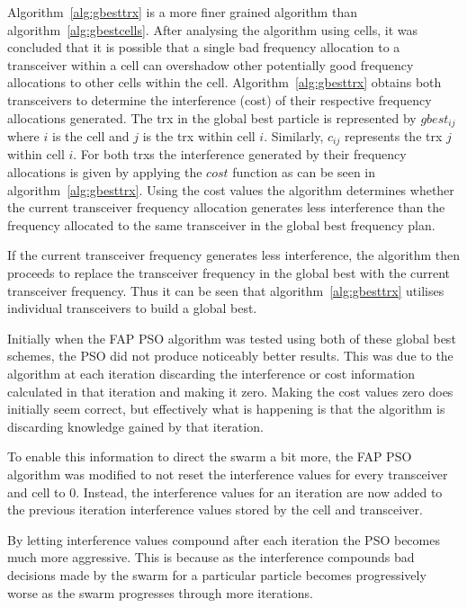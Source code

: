 Algorithm~\ref{alg:gbesttrx} is a more finer grained algorithm than algorithm~\ref{alg:gbestcells}. After analysing the algorithm using cells, it was concluded that it is possible that a single bad frequency allocation to a transceiver within a cell can overshadow other potentially good frequency allocations to other cells within the cell. Algorithm~\ref{alg:gbesttrx} obtains both transceivers to determine the interference (cost) of their respective frequency allocations generated. The trx in the global best particle is represented by $gbest_{ij}$ where $i$ is the cell and $j$ is the trx within cell $i$. Similarly, $c_{ij}$ represents the trx $j$ within cell $i$. For both trxs the interference generated by their frequency allocations is given by applying the $cost$ function as can be seen in algorithm~\ref{alg:gbesttrx}. Using the cost values the algorithm determines whether the current transceiver frequency allocation generates less interference than the frequency allocated to the same transceiver in the global best frequency plan.

If the current transceiver frequency generates less interference, the algorithm then proceeds to replace the transceiver frequency in the global best with the current transceiver frequency. Thus it can be seen that algorithm~\ref{alg:gbesttrx} utilises individual transceivers to build a global best.

Initially when the \gls{FAP} \gls{PSO} algorithm was tested using both of these global best schemes, the \gls{PSO} did not produce noticeably better results. This was due to the algorithm at each iteration discarding the interference or cost information calculated in that iteration and making it zero. Making the cost values zero does initially seem correct, but effectively what is happening is that the algorithm is discarding knowledge gained by that iteration.

To enable this information to direct the swarm a bit more, the \gls{FAP} \gls{PSO} algorithm was modified to not reset the interference values for every transceiver and cell to 0. Instead, the interference values for an iteration are now added to the previous iteration interference values stored by the cell and transceiver. 

By letting interference values compound after each iteration the \gls{PSO} becomes much more aggressive. This is because as the interference compounds bad decisions made by the swarm for a particular particle becomes progressively worse as the swarm progresses through more iterations.

